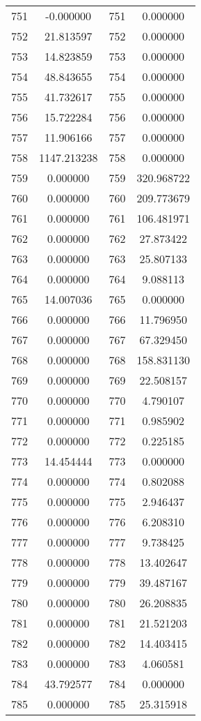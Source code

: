 \documentclass[12pt]{article}
\begin{document}
\begin{longtable}{@{}cccc@{}}
751 & -0.000000 & 751 & 0.000000 \\
752 & 21.813597 & 752 & 0.000000 \\
753 & 14.823859 & 753 & 0.000000 \\
754 & 48.843655 & 754 & 0.000000 \\
755 & 41.732617 & 755 & 0.000000 \\
756 & 15.722284 & 756 & 0.000000 \\
757 & 11.906166 & 757 & 0.000000 \\
758 & 1147.213238 & 758 & 0.000000 \\
759 & 0.000000 & 759 & 320.968722 \\
760 & 0.000000 & 760 & 209.773679 \\
761 & 0.000000 & 761 & 106.481971 \\
762 & 0.000000 & 762 & 27.873422 \\
763 & 0.000000 & 763 & 25.807133 \\
764 & 0.000000 & 764 & 9.088113 \\
765 & 14.007036 & 765 & 0.000000 \\
766 & 0.000000 & 766 & 11.796950 \\
767 & 0.000000 & 767 & 67.329450 \\
768 & 0.000000 & 768 & 158.831130 \\
769 & 0.000000 & 769 & 22.508157 \\
770 & 0.000000 & 770 & 4.790107 \\
771 & 0.000000 & 771 & 0.985902 \\
772 & 0.000000 & 772 & 0.225185 \\
773 & 14.454444 & 773 & 0.000000 \\
774 & 0.000000 & 774 & 0.802088 \\
775 & 0.000000 & 775 & 2.946437 \\
776 & 0.000000 & 776 & 6.208310 \\
777 & 0.000000 & 777 & 9.738425 \\
778 & 0.000000 & 778 & 13.402647 \\
779 & 0.000000 & 779 & 39.487167 \\
780 & 0.000000 & 780 & 26.208835 \\
781 & 0.000000 & 781 & 21.521203 \\
782 & 0.000000 & 782 & 14.403415 \\
783 & 0.000000 & 783 & 4.060581 \\
784 & 43.792577 & 784 & 0.000000 \\
785 & 0.000000 & 785 & 25.315918 \\

\end{longtable}
\end{document}
